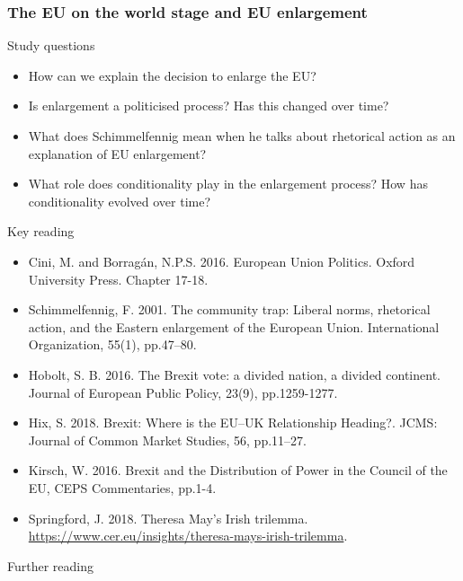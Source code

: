 \subsubsection*{The EU on the world stage and EU enlargement}

Study questions

\begin{itemize}
	\item How can we explain the decision to enlarge the EU?
	\item Is enlargement a politicised process? Has this changed over time? 
	\item What does Schimmelfennig mean when he talks about rhetorical action as an explanation of EU enlargement?
	\item What role does conditionality play in the enlargement process? How has conditionality evolved over time?
\end{itemize}

\noindent Key reading

\begin{itemize}
	\item Cini, M. and Borragán, N.P.S. 2016. European Union Politics. Oxford University Press. Chapter 17-18.
	\item Schimmelfennig, F. 2001. The community trap: Liberal norms, rhetorical action, and the Eastern enlargement of the European Union. International Organization, 55(1), pp.47–80.
	\item Hobolt, S. B. 2016. The Brexit vote: a divided nation, a divided continent. Journal of European Public Policy, 23(9), pp.1259-1277.
	\item Hix, S. 2018. Brexit: Where is the EU–UK Relationship Heading?. JCMS: Journal of Common Market Studies, 56, pp.11–27.
	\item Kirsch, W. 2016. Brexit and the Distribution of Power in the Council of the EU, CEPS Commentaries, pp.1-4. 
	\item Springford, J. 2018. Theresa May's Irish trilemma. \url{https://www.cer.eu/insights/theresa-mays-irish-trilemma}.
\end{itemize}

\noindent Further reading

